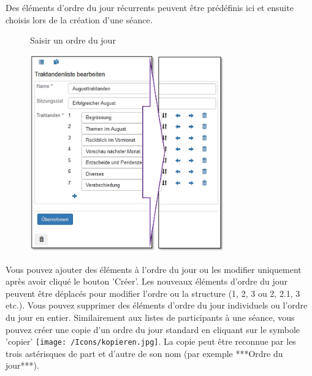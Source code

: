 Des éléments d'ordre du jour récurrents peuvent être prédéfinis ici et ensuite choisis lors de la création d'une séance.

\begin{figure}[H]
\caption{Saisir un ordre du jour}
\end{figure}

\begin{figure}
\vspace{-15pt}
\includegraphics[height=85mm]{../chapters/13_Konfigurationen/pictures/13-10_TraktandenlistenBearbeiten.jpg}
\end{figure}

Vous pouvez ajouter des éléments à l'ordre du jour ou les modifier uniquement après avoir cliqué le bouton 'Créer'. Les nouveaux éléments d'ordre du jour peuvent être déplacés pour modifier l'ordre ou la structure (1, 2, 3 ou 2, 2.1, 3 etc.). Vous pouvez supprimer des éléments d'ordre du jour individuels ou l'ordre du jour en entier. Similairement aux listes de participants à une séance, vous pouvez créer une copie d'un ordre du jour standard en cliquant sur le symbole 'copier' \texttt{[image: /Icons/kopieren.jpg]}. La copie peut être reconnue par les trois astérisques de part et d'autre de son nom (par exemple ***Ordre du jour***).
